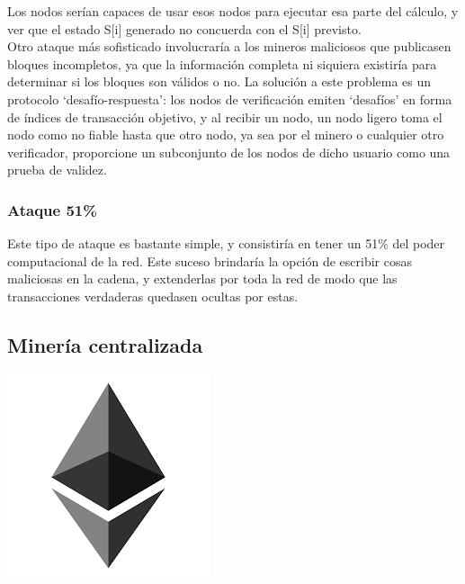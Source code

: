 \documentclass[11pt,a4paper]{article}
\begin{document}
Los nodos serían capaces de usar esos nodos para ejecutar esa parte del cálculo, y ver que el estado S[i] generado no concuerda con el S[i] previsto.\\ 

Otro ataque más sofisticado involucraría a los mineros maliciosos que publicasen bloques
incompletos, ya que la información completa ni siquiera existiría para determinar si los bloques son válidos o no. La solución a este problema es un protocolo ‘desafío-respuesta’: los nodos de verificación emiten ‘desafíos’ en forma de índices de transacción objetivo, y al recibir un nodo, un nodo ligero toma el nodo como no fiable hasta que otro nodo, ya sea por el minero o cualquier otro verificador, proporcione un subconjunto de los nodos de dicho usuario como una prueba de validez.

\subsubsection{Ataque 51\%}

Este tipo de ataque es bastante simple, y consistiría en tener un 51\% del poder computacional de la red. Este suceso brindaría la opción de escribir cosas maliciosas en la cadena, y extenderlas por toda la red de modo que las transacciones verdaderas quedasen ocultas por estas.


\subsection{Minería centralizada}

\newpage
\begin{center}
  \includegraphics[scale=.42]{images/logo.png}
\end{center}

\tableofcontents
\end{document}
